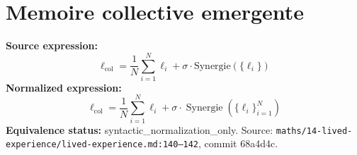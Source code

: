 \section*{Memoire collective emergente}
\textbf{Source expression:}
\[\ell_{\mathrm{col}} = \frac{1}{N}\sum_{i=1}^{N} \ell_i + \sigma \cdot \mathrm{Synergie}(\{\ell_i\})\]
\textbf{Normalized expression:}
\[\ell_{\mathrm{col}} = \frac{1}{N}\sum_{i=1}^{N} \ell_i + \sigma \cdot \operatorname{Synergie}(\{\ell_i\}_{i=1}^{N})\]
\textbf{Equivalence status:} syntactic\_normalization\_only. Source: \texttt{maths/14-lived-experience/lived-experience.md:140--142}, commit 68a4d4c.
